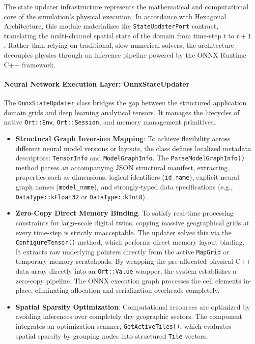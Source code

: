 The state updater infrastructure represents the mathematical and computational core of the simulation's physical execution. In accordance 
with Hexagonal Architecture, this module materializes the \texttt{StateUpdaterPort} contract, translating the multi-channel spatial 
state of the domain from time-step $t$ to $t+1$. Rather than relying on traditional, slow numerical solvers, the architecture decouples 
physics through an inference pipeline powered by the ONNX Runtime C++ framework.

\paragraph{Neural Network Execution Layer: OnnxStateUpdater}

The \texttt{OnnxStateUpdater} class bridges the gap between the structured application domain grids and deep learning analytical 
tensors. It manages the lifecycles of native \texttt{Ort::Env}, \texttt{Ort::Session}, and memory management primitives.

\begin{itemize}
    \item \textbf{Structural Graph Inversion Mapping}: To achieve flexibility across different neural model versions or layouts, the 
    class defines localized metadata descriptors: \texttt{TensorInfo} and \texttt{ModelGraphInfo}. The \texttt{ParseModelGraphInfo()} 
    method parses an accompanying JSON structural manifest, extracting properties such as dimensions, logical identifiers 
    (\texttt{id\_name}), explicit neural graph names (\texttt{model\_name}), and strongly-typed data specifications (e.g., 
    \texttt{DataType::kFloat32} or \texttt{DataType::kInt8}).
    
    \item \textbf{Zero-Copy Direct Memory Binding}: To satisfy real-time processing constraints for large-scale digital twins, 
    copying massive geographical grids at every time-step is strictly unacceptable. The updater solves this via the 
    \texttt{ConfigureTensor()} method, which performs direct memory layout binding. It extracts raw underlying pointers directly 
    from the active \texttt{MapGrid} or temporary memory scratchpads. By wrapping the pre-allocated physical C++ data array directly into an \texttt{Ort::Value} wrapper, the system establishes a 
    zero-copy pipeline. The ONNX execution graph processes the cell elements in-place, eliminating allocation and serialization 
    overheads completely.
    
    \item \textbf{Spatial Sparsity Optimization}: Computational resources are optimized by avoiding inferences over completely dry 
    geographic sectors. The component integrates an optimization scanner, \texttt{GetActiveTiles()}, which evaluates spatial sparsity 
    by grouping nodes into structured \texttt{Tile} vectors.
\end{itemize}

